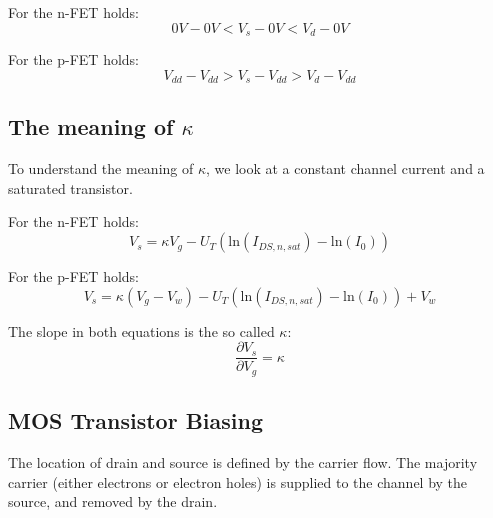\documentclass[main]{subfiles}
\begin{document}
For the n-FET holds:
\begin{equation}
0\unit{V} - 0\unit{V} < V_s - 0\unit{V} < V_d - 0\unit{V}
\label{eq:nFETbias}
\end{equation}

For the p-FET holds:
\begin{equation}
V_{dd} - V_{dd} > V_s - V_{dd} > V_d - V_{dd}
\label{eq:pFETbias}
\end{equation}

\subsection{The meaning of $\kappa$}
To understand the meaning of $\kappa$, we look at a constant channel current and a saturated transistor.

For the n-FET holds:
\begin{equation}
V_s = \kappa V_g - U_T(\mathrm{ln}(I_{DS,n,sat})-\mathrm{ln}(I_0))
\label{eq:nFETv_s}
\end{equation}

For the p-FET holds:
\begin{equation}
V_s = \kappa (V_g - V_w) - U_T(\mathrm{ln}(I_{DS,n,sat})-\mathrm{ln}(I_0)) + V_w
\label{eq:pFETv_s}
\end{equation}

The slope in both equations is the so called $\kappa$:
\begin{equation}
\frac{\partial V_s}{\partial V_g} = \kappa
\end{equation}

\subsection{MOS Transistor Biasing}

The location of drain and source is defined by the carrier flow\cite{book:VLSI}.
The majority carrier (either electrons or electron holes) is supplied to the channel by the source, and removed by the drain.
\end{document}
